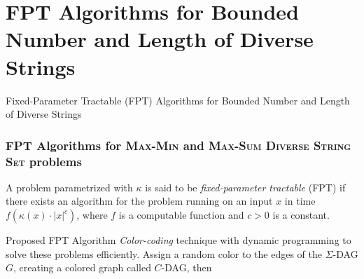 \documentclass{beamer}
\begin{document}

\section{FPT Algorithms for Bounded Number and Length of Diverse Strings}
\begin{frame}
    \begin{center}
        \huge{Fixed-Parameter Tractable (FPT) Algorithms for Bounded Number and Length of Diverse Strings}
    \end{center}
\end{frame}

\begin{frame}
    \frametitle{FPT Algorithms for \textsc{Max-Min} and \textsc{Max-Sum Diverse String Set} problems}
    \begin{definition}
        A problem parametrized with $\kappa$ is said to be \emph{fixed-parameter tractable} (FPT) if there exists an algorithm for the problem running on an input $x$ in time $f(\kappa (x) \cdot |x|^c)$, where $f$ is a computable function and $c > 0$ is a constant.
    \end{definition}
    \begin{block}{Proposed FPT Algorithm}
        \textit{Color-coding} technique with dynamic programming to solve these problems efficiently. Assign a random color to the edges of the $\Sigma$-DAG $G$, creating a colored graph called $C$-DAG, then
    \end{block}

\end{frame}
\end{document}
